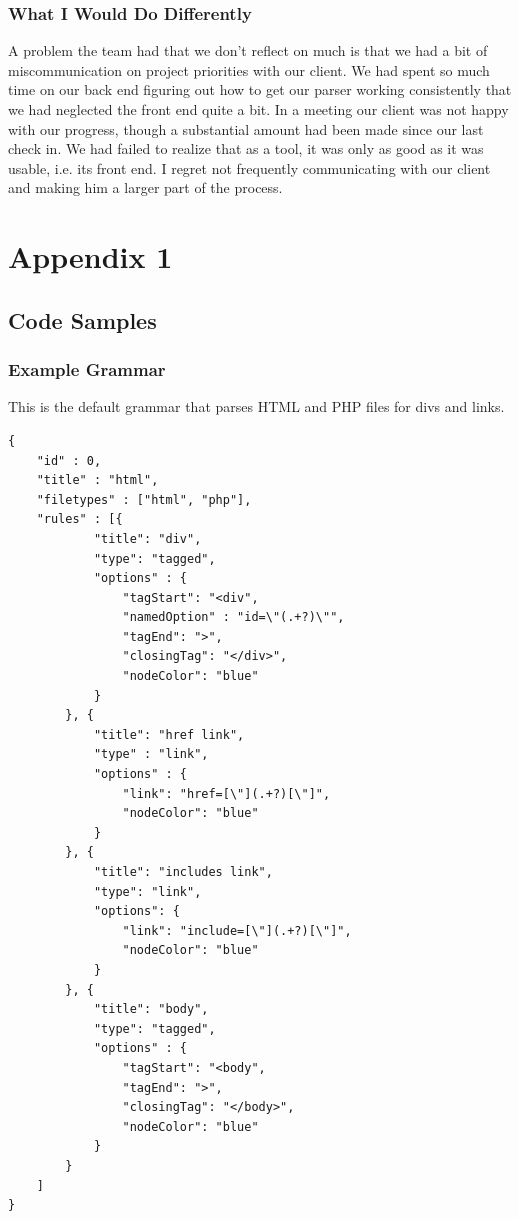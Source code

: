 \documentclass[letterpaper,10pt,titlepage,draftclsnofoot,onecolumn,onesided] {IEEEtran}
\begin{document}
 
\subsubsection{What I Would Do Differently}
A problem the team had that we don't reflect on much is that we had a bit of miscommunication on project priorities with our client. 
We had spent so much time on our back end figuring out how to get our parser working consistently that we had neglected the front end quite a bit. 
In a meeting our client was not happy with our progress, though a substantial amount had been made since our last check in. 
We had failed to realize that as a tool, it was only as good as it was usable, i.e. its front end. 
I regret not frequently communicating with our client and making him a larger part of the process.


\pagebreak
\section{Appendix 1}
\subsection{Code Samples}
	\subsubsection{Example Grammar}
	This is the default grammar that parses HTML and PHP files for divs and links.
	
	\begin{lstlisting}
{
    "id" : 0,
    "title" : "html",
    "filetypes" : ["html", "php"],
    "rules" : [{
            "title": "div",
            "type": "tagged",
            "options" : {
                "tagStart": "<div",
                "namedOption" : "id=\"(.+?)\"",
                "tagEnd": ">",
                "closingTag": "</div>",
                "nodeColor": "blue"
            }
        }, {
            "title": "href link",
            "type" : "link",
            "options" : {
                "link": "href=[\"](.+?)[\"]",
                "nodeColor": "blue"
            }
        }, {
            "title": "includes link",
            "type": "link",
            "options": {
                "link": "include=[\"](.+?)[\"]",
                "nodeColor": "blue"
            }
        }, {
            "title": "body",
            "type": "tagged",
            "options" : {
                "tagStart": "<body",
                "tagEnd": ">",
                "closingTag": "</body>",
                "nodeColor": "blue"
            }
        }
    ]
}
	\end{lstlisting}
\end{document}
